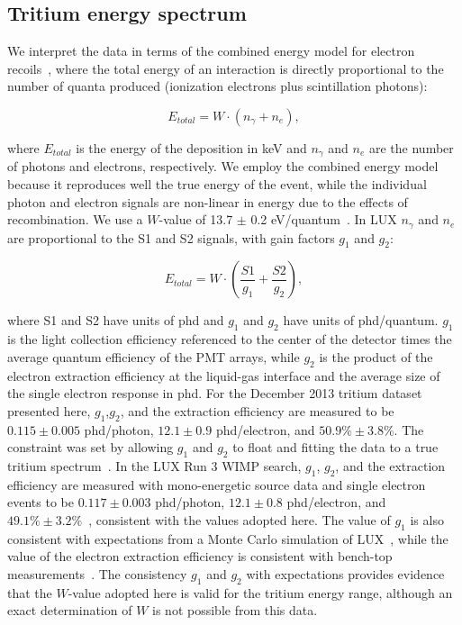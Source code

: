 \subsection{Tritium energy spectrum}

We interpret the data in terms of the combined energy model for electron recoils~\cite{Platzman}, where the total energy of an interaction is directly proportional to the number of quanta produced (ionization electrons plus scintillation photons):

\begin{equation}
E_{total} = W \cdot (n_{\gamma} + n_e ),
\label{platzman_eq}
\end{equation}

\noindent
where $E_{total}$ is the energy of the deposition in keV and  $n_\gamma$ and $n_e$ are the number of photons and electrons, respectively. We employ the combined energy model because it reproduces well the true energy of the event, while the individual photon and electron signals are non-linear in energy due to the effects of recombination. We use a $W$-value of 13.7 $\pm$ 0.2 eV/quantum~\cite{Dahl_Thesis}. In LUX $n_{\gamma}$ and $n_e$ are proportional to the S1 and S2 signals, with gain factors $g_1$ and $g_2$: 

\begin{equation}
E_{total} = W \cdot \left(\frac{S1}{g_1} + \frac{S2}{g_2} \right),
\label{energy_eq}
\end{equation}

\noindent
where S1 and S2 have units of phd and $g_1$ and $g_2$ have units of phd/quantum. $g_1$ is the light collection efficiency referenced to the center of the detector times the average quantum efficiency of the PMT arrays, while $g_2$ is the product of the electron extraction efficiency at the liquid-gas interface and the average size of the single electron response in phd. For the December 2013 tritium dataset presented here, $g_1$,$g_2$, and the extraction efficiency are measured to be $0.115 \pm 0.005$ phd/photon, $12.1 \pm 0.9$ phd/electron, and $50.9\% \pm 3.8\%$. The constraint was set by allowing $g_1$ and $g_2$ to float and fitting the data to a true tritium spectrum~\cite{Drexlin:2013lha}.  In the LUX Run 3 WIMP search, $g_1$, $g_2$, and the extraction efficiency are measured with mono-energetic source data and single electron events to be $0.117 \pm 0.003$ phd/photon, $12.1 \pm 0.8$ phd/electron, and $49.1\% \pm 3.2\%$~\cite{lux-reanalysis, lux-prd}, consistent with the values adopted here. The value of $g_1$ is also consistent with expectations from a Monte Carlo simulation of LUX~\cite{lux-prd}, while the value of the electron extraction efficiency is consistent with bench-top measurements~\cite{gushchin:1979,gushchin:1982}. The consistency $g_1$ and $g_2$ with expectations provides evidence that the $W$-value adopted here is valid for the tritium energy range, although an exact determination of $W$ is not possible from this data. 

